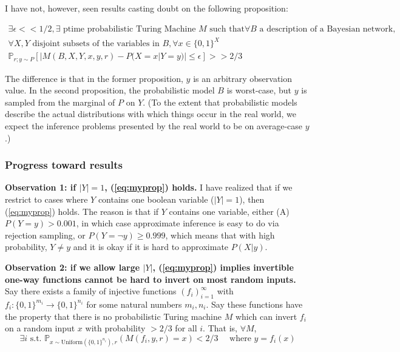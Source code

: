 \documentclass{article}
\newcommand{\NP}{\mathbf{NP}}
\begin{document}
I have not, however, seen results casting doubt on the following proposition:

\begin{multline} \label{eq:myprop}
    \exists \epsilon << 1/2,
    \exists \text{ ptime probabilistic Turing Machine } M \text{ such that} \forall B \text{ a description of a Bayesian network, } \\
    \forall X, Y \text{ disjoint subsets of the variables in } B, \forall x \in \{0, 1\}^X \\
    \mathbb{P}_{r; y \sim P}[|M(B, X, Y, x, y, r) - P(X = x | Y = y)| \leq \epsilon] >> 2/3
\end{multline}

The difference is that in the former proposition, $y$ is an arbitrary observation value.  In the second proposition, the probabilistic model $B$ is worst-case, but $y$ is sampled from the marginal of $P$ on $Y$.  (To the extent that probabilistic models describe the actual distributions with which things occur in the real world, we expect the inference problems presented by the real world to be on average-case $y$.)



\subsubsection{Progress toward results}

\textbf{Observation 1: if $|Y| = 1$, (\ref{eq:myprop}) holds.} I have realized that if we restrict to cases where $Y$ contains one boolean variable ($|Y| = 1$), then (\ref{eq:myprop}) holds.  The reason is that if $Y$ contains one variable, either (A) $P(Y = y) > 0.001$, in which case approximate inference is easy to do via rejection sampling, or $P(Y = \neg y) \geq 0.999$, which means that with high probability, $Y \neq y$ and it is okay if it is hard to approximate $P(X | y)$.

\vspace{3pt}
\noindent \textbf{Observation 2: if we allow large $|Y|$, (\ref{eq:myprop}) implies invertible one-way functions cannot be hard to invert on most random inputs.}
Say there exists a family of injective functions $(f_i)_{i=1}^\infty$ with $f_i : \{0, 1\}^{m_i} \to \{0, 1\}^{n_i}$ for some natural numbers $m_i, n_i$. Say these functions have the property that there is no probabilistic Turing machine $M$ which can invert $f_i$ on a random input $x$ with probability $> 2/3$ for all $i$.  That is, $\forall M$,
$$
\exists i \text{ s.t. }
\mathbb{P}_{x \sim \text{Uniform}(\{0, 1\}^{n_i}), r}(M(f_i, y, r) = x) < 2/3 \quad \text{ where } y = f_i(x)
$$
\end{document}
